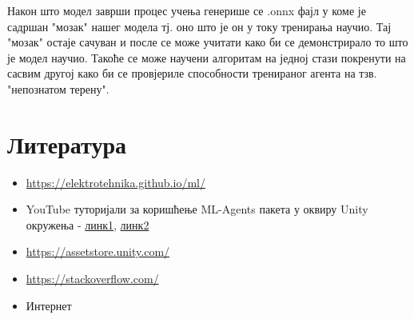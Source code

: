 \documentclass[12pt]{article}
\begin{document}
\vspace{0.5cm}
Након што модел заврши процес учења генерише се .onnx фајл у коме је садршан "мозак" нашег модела тј. оно што је он у току тренирања научио. Тај "мозак" остаје сачуван и после се може учитати како би се демонстрирало то што је модел научио. Такоће се може научени алгоритам на једној стази покренути на сасвим другој како би се провјериле способности тренираног агента на тзв. "непознатом терену". 




\newpage
\section{Литература}
\begin{itemize}
  \item \url{https://elektrotehnika.github.io/ml/}
  \item YouTube туторијали за коришћење ML-Agents пакета у оквиру Unity окружења - \href{https://www.youtube.com/watch?v=zPFU30tbyKs&list=PLzDRvYVwl53vehwiN_odYJkPBzcqFw110&index=1}{линк1}, \href{https://www.youtube.com/watch?v=2X5m_nDBvS4&list=PLzDRvYVwl53vehwiN_odYJkPBzcqFw110&index=4}{линк2}
  \item \url{https://assetstore.unity.com/}
  \item \url{https://stackoverflow.com/}
  \item Интернет
\end{itemize}
\end{document}
